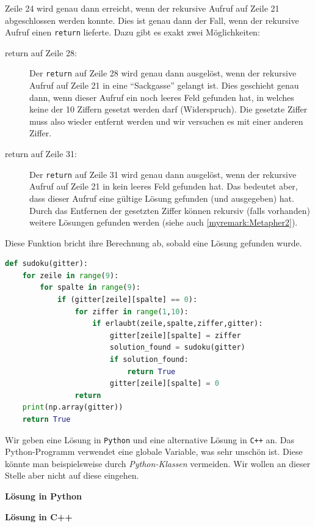 \begin{myanswer}[myexercise:0681]
	Zeile 24 wird genau dann erreicht, wenn der rekursive Aufruf auf Zeile 21 abgeschlossen werden konnte. Dies ist genau dann der Fall, wenn der rekursive Aufruf einen \lstinline|return| lieferte. Dazu gibt es exakt zwei Möglichkeiten:
	\begin{description}
		\item[return auf Zeile 28:] Der \lstinline|return| auf Zeile 28 wird genau dann ausgelöst, wenn der rekursive Aufruf auf Zeile 21 in eine \enquote{Sackgasse} gelangt ist. Dies geschieht genau dann, wenn dieser Aufruf ein noch leeres Feld gefunden hat, in welches keine der 10 Ziffern gesetzt werden darf (Widerspruch). Die gesetzte Ziffer muss also wieder entfernt werden und wir versuchen es mit einer anderen Ziffer.
		\item[return auf Zeile 31:] Der \lstinline|return| auf Zeile 31 wird genau dann ausgelöst, wenn der rekursive Aufruf auf Zeile 21 in kein leeres Feld gefunden hat. Das bedeutet aber, dass dieser Aufruf eine gültige Lösung gefunden (und ausgegeben) hat. Durch das Entfernen der gesetzten Ziffer können rekursiv (falls vorhanden) weitere Lösungen gefunden werden (siehe auch \cref{myremark:Metapher2}).
	\end{description}
\end{myanswer}

\begin{myanswer}[myexercise:0603]
	Diese Funktion bricht ihre Berechnung ab, sobald eine Lösung gefunden wurde.
	\begin{lstlisting}[language=Python,caption=Implementation der Funktion \lstinline|sudoku|,label=listing:sudokuUnique]
def sudoku(gitter):
	for zeile in range(9):
		for spalte in range(9):
			if (gitter[zeile][spalte] == 0):
				for ziffer in range(1,10):
					if erlaubt(zeile,spalte,ziffer,gitter):
						gitter[zeile][spalte] = ziffer
						solution_found = sudoku(gitter)
						if solution_found:
							return True
						gitter[zeile][spalte] = 0
				return
	print(np.array(gitter))
	return True
\end{lstlisting}
\end{myanswer}

\begin{myanswer}[myexercise:0604]
	\lstset{basicstyle=\ttfamily\footnotesize}
	Wir geben eine Lösung in \verb|Python| und eine alternative Lösung in \verb|C++| an. Das Python-Programm verwendet eine globale Variable, was sehr unschön ist. Diese könnte man beispielsweise durch \textit{Python-Klassen} vermeiden. Wir wollen an dieser Stelle aber nicht auf diese eingehen.
	\vspace{1cm}

	\textbf{Lösung in Python}
	

	\textbf{Lösung in C++}
	
	
	
\end{myanswer}

\lstset{style=BaselineStyle}


\clearpage
\shipoutAnswer
